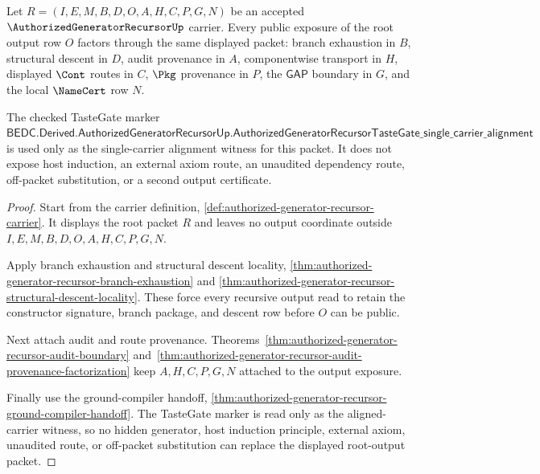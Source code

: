 \begin{theorem}
\label{thm:authorized-generator-recursor-root-output-totality-lock}
Let $R=(I,E,M,B,D,O,A,H,C,P,G,N)$ be an accepted $\AuthorizedGeneratorRecursorUp$ carrier. Every public exposure of the root output row $O$ factors through the same displayed packet: branch exhaustion in $B$, structural descent in $D$, audit provenance in $A$, componentwise transport in $H$, displayed $\Cont$ routes in $C$, $\Pkg$ provenance in $P$, the $\mathsf{GAP}$ boundary in $G$, and the local $\NameCert$ row $N$.

The checked TasteGate marker
$\mathsf{BEDC.Derived.AuthorizedGeneratorRecursorUp.AuthorizedGeneratorRecursorTasteGate\_single\_carrier\_alignment}$
is used only as the single-carrier alignment witness for this packet. It does not expose host induction, an external axiom route, an unaudited dependency route, off-packet substitution, or a second output certificate.
\end{theorem}
\begin{proof}
Start from the carrier definition, \autoref{def:authorized-generator-recursor-carrier}. It displays the root packet $R$ and leaves no output coordinate outside $I,E,M,B,D,O,A,H,C,P,G,N$.

Apply branch exhaustion and structural descent locality, \autoref{thm:authorized-generator-recursor-branch-exhaustion} and \autoref{thm:authorized-generator-recursor-structural-descent-locality}. These force every recursive output read to retain the constructor signature, branch package, and descent row before $O$ can be public.

Next attach audit and route provenance. Theorems~\ref{thm:authorized-generator-recursor-audit-boundary} and~\ref{thm:authorized-generator-recursor-audit-provenance-factorization} keep $A,H,C,P,G,N$ attached to the output exposure.

Finally use the ground-compiler handoff, \autoref{thm:authorized-generator-recursor-ground-compiler-handoff}. The TasteGate marker is read only as the aligned-carrier witness, so no hidden generator, host induction principle, external axiom, unaudited route, or off-packet substitution can replace the displayed root-output packet.
\end{proof}

